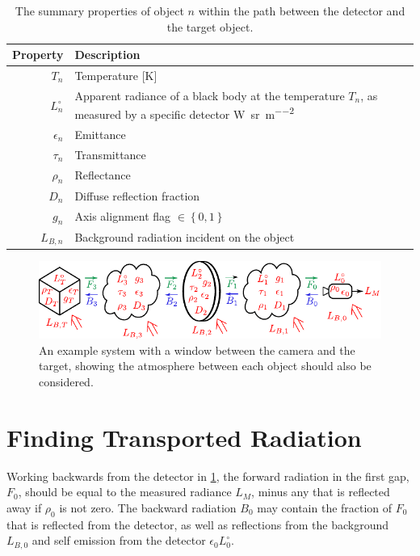 \documentclass[11pt,a4paper]{article}
\begin{document}
\begin{table}
	\centering
	\begin{tabular}{r|p{100mm}}
		\toprule
		Property& Description \\
		\midrule
		$ T_n $& Temperature [\si{\kelvin}]  \\
		$ L^\circ_n $& Apparent radiance of a black body at the temperature $ T_n $, as measured by a specific detector \si{\watt\per\steradian\per\square\metre} \\
		$\epsilon_n$& Emittance \\
		$\tau_n$& Transmittance \\
		$ \rho_n $& Reflectance \\
		$ D_n $& Diffuse reflection fraction\\
		$ g_n $& Axis alignment flag $ \in \left\{0,1\right\} $\\
		$ L_{B,n} $& Background radiation incident on the object\\
		\bottomrule
	\end{tabular}
\caption{The summary properties of object $ n $ within the path between the detector and the target object.}
\label{tab:properties}
\end{table}

\begin{figure}
	\centering
	\includegraphics[width=\textwidth]{./infrobjects_scheme.pdf}
	\caption{An example system with a window between the camera and the target, showing the atmosphere between each object should also be considered.}
	\label{fig:scheme}
\end{figure}

\section{Finding Transported Radiation}

Working backwards from the detector in \cref{fig:scheme}, the forward radiation in the first gap, $ F_0 $, should be equal to the measured radiance $ L_M $, minus any that is reflected away if $ \rho_0 $ is not zero. The backward radiation $ B_0 $ may contain the fraction of $ F_0 $ that is reflected from the detector, as well as reflections from the background $ L_{B,0} $ and self emission from the detector $ \epsilon_0 L^\circ_0 $.
\end{document}
